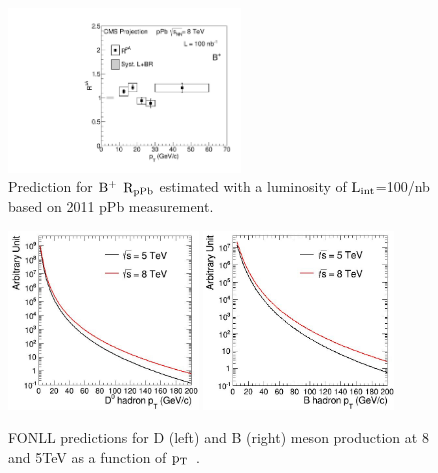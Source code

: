 \begin{figure}[h]
\begin{center}
\includegraphics[width= 0.55\textwidth]{figures/canvasrpabplus}
\caption{Prediction for $\rm B^{+}$ $\rm R_{pPb}$ estimated with a luminosity of $\rm L_{int}$=100/nb based on 2011 pPb measurement.}
\label{fig:Bextrapolated}
\end{center}
\end{figure}


\begin{figure}[h]
\begin{center}
\includegraphics[width= 0.45\textwidth]{figures/D-Sigma.jpg}
\includegraphics[width= 0.45\textwidth]{figures/B-Sigma.jpg}
\caption{FONLL predictions for D (left) and B (right) meson production at 8 and 5TeV as a function of $\rm p_{T}$~\cite{FONLLcharmbottomPP1}.}
\label{fig:plotsDBpredictions}
\end{center}
\end{figure}
